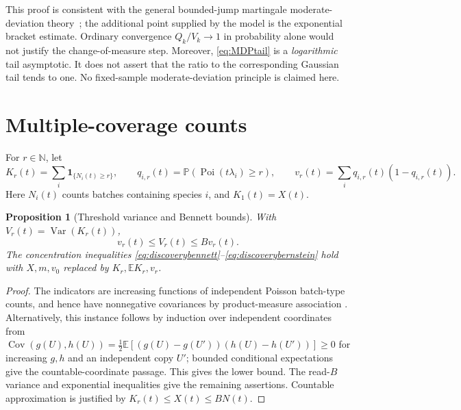 \documentclass[11pt]{article}
\numberwithin{equation}{section}
\newtheorem{proposition}[theorem]{Proposition}
\theoremstyle{definition}
\theoremstyle{remark}
\newcommand{\E}{\mathbb E}
\newcommand{\Pp}{\mathbb P}
\newcommand{\N}{\mathbb N}
\newcommand{\ind}{\mathbf 1}
\newcommand{\Var}{\operatorname{Var}}
\newcommand{\Cov}{\operatorname{Cov}}
\newcommand{\Poi}{\operatorname{Poi}}
\begin{document}
This proof is consistent with the general bounded-jump martingale
moderate-deviation theory~\cite[Corollary~1(a)]{Dembo}; the additional point supplied by the
model is the exponential bracket estimate. Ordinary convergence
$Q_k/V_k\to1$ in probability alone would not justify the change-of-measure
step. Moreover, \eqref{eq:MDPtail} is a \emph{logarithmic} tail asymptotic.
It does not assert that the ratio to the corresponding Gaussian tail tends to
one. No fixed-sample moderate-deviation principle is claimed here.

\section{Multiple-coverage counts}\label{sec:threshold}

For $r\in\N$, let
\[
 K_r(t)=\sum_i\ind_{\{N_i(t)\ge r\}},\qquad
 q_{i,r}(t)=\Pp(\Poi(t\lambda_i)\ge r),\qquad
 v_r(t)=\sum_iq_{i,r}(t)(1-q_{i,r}(t)).
\]
Here $N_i(t)$ counts batches containing species $i$, and $K_1(t)=X(t)$.

\begin{proposition}[Threshold variance and Bennett bounds]\label{prop:thresholdvar}
With $V_r(t)=\Var(K_r(t))$,
\begin{equation}\label{eq:thresholdvar}
 v_r(t)\le V_r(t)\le Bv_r(t).
\end{equation}
The concentration inequalities \eqref{eq:discoverybennett}--\eqref{eq:discoverybernstein}
hold with $X,m,v_0$ replaced by $K_r,\E K_r,v_r$.
\end{proposition}
\begin{proof}
The indicators are increasing functions of independent Poisson batch-type
counts, and hence have nonnegative covariances by product-measure association
\cite{EPW}. Alternatively, this instance follows by induction over independent
coordinates from
$\Cov(g(U),h(U))=\tfrac12\E[(g(U)-g(U'))(h(U)-h(U'))]\ge0$
for increasing $g,h$ and an independent copy $U'$; bounded conditional
expectations give the countable-coordinate passage.
This gives the lower bound. The read-$B$ variance and exponential inequalities
give the remaining assertions. Countable approximation is justified by
$K_r(t)\le X(t)\le BN(t)$.
\end{proof}
\end{document}
